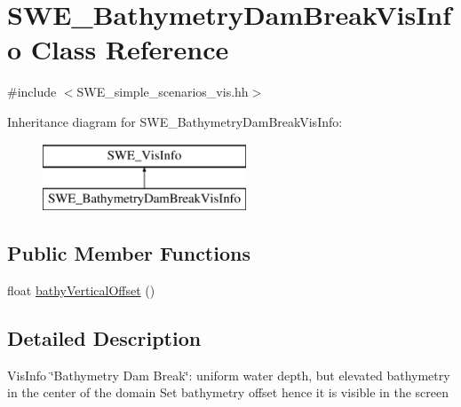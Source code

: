 \hypertarget{classSWE__BathymetryDamBreakVisInfo}{\section{S\-W\-E\-\_\-\-Bathymetry\-Dam\-Break\-Vis\-Info Class Reference}
\label{classSWE__BathymetryDamBreakVisInfo}
}


{\ttfamily \#include $<$S\-W\-E\-\_\-simple\-\_\-scenarios\-\_\-vis.\-hh$>$}

Inheritance diagram for S\-W\-E\-\_\-\-Bathymetry\-Dam\-Break\-Vis\-Info\-:\begin{figure}[H]
\begin{center}
\leavevmode
\includegraphics[height=2.000000cm]{classSWE__BathymetryDamBreakVisInfo}
\end{center}
\end{figure}
\subsection*{Public Member Functions}
\begin{DoxyCompactItemize}
\item 
float \hyperlink{classSWE__BathymetryDamBreakVisInfo_aaecf007665b780a6066485ea0d2d2695}{bathy\-Vertical\-Offset} ()
\end{DoxyCompactItemize}


\subsection{Detailed Description}
Vis\-Info \char`\"{}\-Bathymetry Dam Break\char`\"{}\-: uniform water depth, but elevated bathymetry in the center of the domain Set bathymetry offset hence it is visible in the screen 


